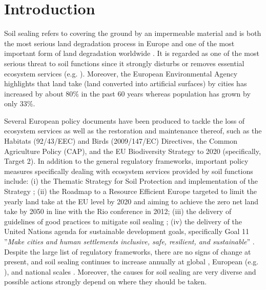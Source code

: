\documentclass[APA,LATO1COL,doublespace]{WileyNJD-v2}
\begin{document}

\section{Introduction}\label{sec1}
Soil sealing refers to covering the ground by an impermeable material and is both the most serious land degradation process in Europe \citep{Montanarella2016} and one of the most important form of land degradation worldwide \citep{FAO15}.
It is regarded as one of the most serious threat to soil functions since it strongly disturbs or removes essential ecosystem services (e.g. \citealp{Calzolari16,Dunbar13}).
Moreover, the European Environmental Agency \citep{EEA2011} highlights that land take (land converted into artificial surfaces) by cities has increased by about 80\% in the past 60 years whereas population has grown by only 33\%.

Several European policy documents have been produced to tackle the loss of ecosystem services as well as the restoration and maintenance thereof, such as the Habitats (92/43/EEC) and Birds (2009/147/EC) Directives, the Common Agriculture Policy (CAP), and the EU Biodiversity Strategy to 2020 (specifically, Target 2).
In addition to the general regulatory frameworks, important policy measures specifically dealing with ecosystem services provided by soil functions include: 
(i) the Thematic Strategy for Soil Protection \citep{EC2006} and implementation of the Strategy \citep{EC2012}; 
(ii) the Roadmap to a Resource Efficient Europe \citep{EC2011a} targeted to limit the yearly land take at the EU level by 2020 and aiming to achieve the zero net land take by 2050 in line with the Rio conference in 2012; 
(iii) the delivery of guidelines of good practices to mitigate soil sealing \citep{SWD12};
(iv) the delivery of the United Nations agenda \citep{UN15} for sustainable development goals, specifically Goal 11 ''\textit{Make cities and human settlements inclusive, safe, resilient, and sustainable}'' \citep{Keesstra16}.
Despite the large list of regulatory frameworks, there are no signs of change at present, and soil sealing continues to increase annually \citep{FAO15} at global \citep[e.g.][]{BioDiv2012,UN2014}, European (e.g. \citealp{SWD12}), and national scales \citep[e.g.][Copernicus Land Monitoring Service\footnote{ http://land.copernicus.eu}]{ISPRA16,ISPRA18}.
Moreover, the causes for soil sealing are very diverse and possible actions strongly depend on where they should be taken.
\end{document}
